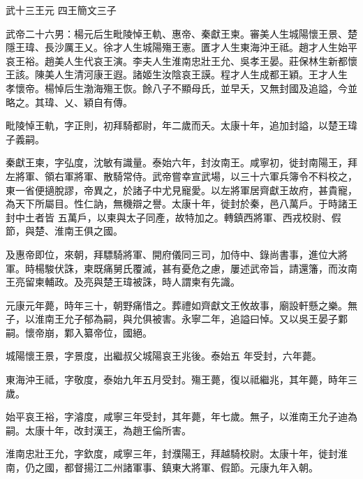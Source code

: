 
\begin{pinyinscope}

 武十三王元
 四王簡文三子



 武帝二十六男：楊元后生毗陵悼王軌、惠帝、秦獻王柬。審美人生城陽懷王景、楚隱王瑋、長沙厲王乂。徐才人生城陽殤王憲。匱才人生東海沖王祗。趙才人生始平哀王裕。趙美人生代哀王演。李夫人生淮南忠壯王允、吳孝王晏。莊保林生新都懷王該。陳美人生清河康王遐。諸姬生汝陰哀王謨。程才人生成都王穎。王才人生
 孝懷帝。楊悼后生渤海殤王恢。餘八子不顯母氏，並早夭，又無封國及追謚，今並略之。其瑋、乂、穎自有傳。



 毗陵悼王軌，字正則，初拜騎都尉，年二歲而夭。太康十年，追加封謚，以楚王瑋子義嗣。



 秦獻王柬，字弘度，沈敏有識量。泰始六年，封汝南王。咸寧初，徙封南陽王，拜左將軍、領右軍將軍、散騎常侍。武帝嘗幸宣武場，以三十六軍兵簿令不料校之，東一省便擿脫謬，帝異之，於諸子中尤見寵愛。以左將軍居齊獻王故府，甚貴寵，為天下所屬目。性仁訥，無機辯之譽。太康十年，徙封於秦，邑八萬戶。于時諸王封中土者皆
 五萬戶，以柬與太子同產，故特加之。轉鎮西將軍、西戎校尉、假節，與楚、淮南王俱之國。



 及惠帝即位，來朝，拜驃騎將軍、開府儀同三司，加侍中、錄尚書事，進位大將軍。時楊駿伏誅，柬既痛舅氏覆滅，甚有憂危之慮，屢述武帝旨，請還籓，而汝南王亮留柬輔政。及亮與楚王瑋被誅，時人謂柬有先識。



 元康元年薨，時年三十，朝野痛惜之。葬禮如齊獻文王攸故事，廟設軒懸之樂。無子，以淮南王允子郁為嗣，與允俱被害。永寧二年，追謚曰悼。又以吳王晏子鄴嗣。懷帝崩，鄴入纂帝位，國絕。



 城陽懷王景，字景度，出繼叔父城陽哀王兆後。泰始五
 年受封，六年薨。



 東海沖王祗，字敬度，泰始九年五月受封。殤王薨，復以祗繼兆，其年薨，時年三歲。



 始平哀王裕，字濬度，咸寧三年受封，其年薨，年七歲。無子，以淮南王允子迪為嗣。太康十年，改封漢王，為趙王倫所害。



 淮南忠壯王允，字欽度，咸寧三年，封濮陽王，拜越騎校尉。太康十年，徙封淮南，仍之國，都督揚江二州諸軍事、鎮東大將軍、假節。元康九年入朝。




\end{pinyinscope}
